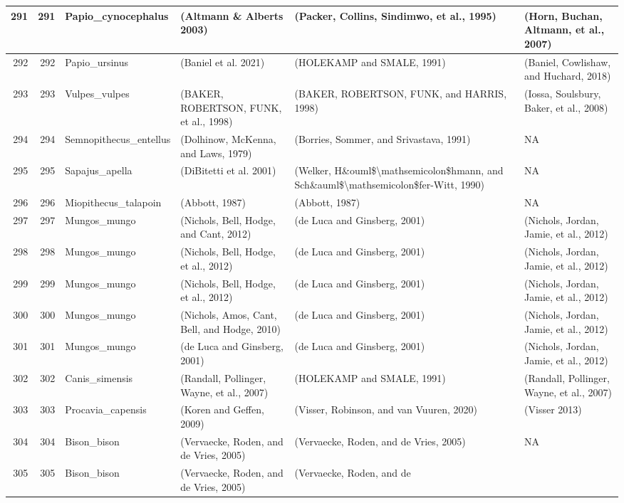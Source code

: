 \documentclass[
]{article}
\begin{document}
\begin{tabular}{r|r|l|l|l|l}
\hline
291 & 291 & Papio\_cynocephalus & (Altmann \& Alberts 2003) & (Packer, Collins, Sindimwo, et al., 1995) & (Horn, Buchan, Altmann, et al., 2007)\\
\hline
292 & 292 & Papio\_ursinus & (Baniel et al. 2021) & (HOLEKAMP and SMALE, 1991) & (Baniel, Cowlishaw, and Huchard, 2018)\\
\hline
293 & 293 & Vulpes\_vulpes & (BAKER, ROBERTSON, FUNK, et al., 1998) & (BAKER, ROBERTSON, FUNK, and HARRIS, 1998) & (Iossa, Soulsbury, Baker, et al., 2008)\\
\hline
294 & 294 & Semnopithecus\_entellus & (Dolhinow, McKenna, and Laws, 1979) & (Borries, Sommer, and Srivastava, 1991) & NA\\
\hline
295 & 295 & Sapajus\_apella & (DiBitetti et al. 2001) & (Welker, H\&ouml\$\textbackslash{}mathsemicolon\$hmann, and Sch\&auml\$\textbackslash{}mathsemicolon\$fer-Witt, 1990) & NA\\
\hline
296 & 296 & Miopithecus\_talapoin & (Abbott, 1987) & (Abbott, 1987) & NA\\
\hline
297 & 297 & Mungos\_mungo & (Nichols, Bell, Hodge, and Cant, 2012) & (de
Luca and Ginsberg, 2001) & (Nichols, Jordan, Jamie, et al., 2012)\\
\hline
298 & 298 & Mungos\_mungo & (Nichols, Bell, Hodge, et al., 2012) & (de
Luca and Ginsberg, 2001) & (Nichols, Jordan, Jamie, et al., 2012)\\
\hline
299 & 299 & Mungos\_mungo & (Nichols, Bell, Hodge, et al., 2012) & (de
Luca and Ginsberg, 2001) & (Nichols, Jordan, Jamie, et al., 2012)\\
\hline
300 & 300 & Mungos\_mungo & (Nichols, Amos, Cant, Bell, and Hodge, 2010) & (de
Luca and Ginsberg, 2001) & (Nichols, Jordan, Jamie, et al., 2012)\\
\hline
301 & 301 & Mungos\_mungo & (de
Luca and Ginsberg, 2001) & (de
Luca and Ginsberg, 2001) & (Nichols, Jordan, Jamie, et al., 2012)\\
\hline
302 & 302 & Canis\_simensis & (Randall, Pollinger, Wayne, et al., 2007) & (HOLEKAMP and SMALE, 1991) & (Randall, Pollinger, Wayne, et al., 2007)\\
\hline
303 & 303 & Procavia\_capensis & (Koren and Geffen, 2009) & (Visser, Robinson, and van
Vuuren, 2020) & (Visser 2013)\\
\hline
304 & 304 & Bison\_bison & (Vervaecke, Roden, and de
Vries, 2005) & (Vervaecke, Roden, and de
Vries, 2005) & NA\\
\hline
305 & 305 & Bison\_bison & (Vervaecke, Roden, and de
Vries, 2005) & (Vervaecke, Roden, and de

\end{tabular}
\end{document}
